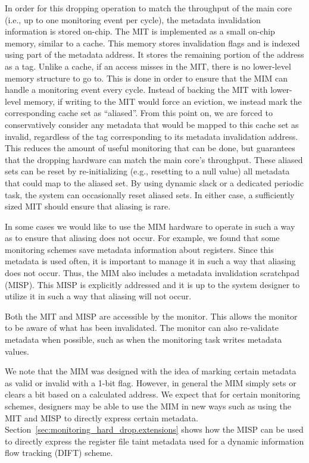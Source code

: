 In order for this dropping operation to match the throughput of the main core
(i.e., up to one monitoring event per cycle), the metadata invalidation
information is stored on-chip. The MIT is implemented as a small on-chip
memory, similar to a cache. This memory stores invalidation flags and is
indexed using part of the metadata address. It stores the remaining portion of
the address as a tag. Unlike a cache, if an access misses in the MIT, there is
no lower-level memory structure to go to. This is done in order to ensure that
the MIM can handle a monitoring event every cycle. Instead of backing the MIT
with lower-level memory, if writing to the MIT would force an eviction, we
instead mark the corresponding cache set as ``aliased''. From this point on, we
are forced to conservatively consider any metadata that would be mapped to this
cache set as invalid, regardless of the tag corresponding to its metadata
invalidation address. This reduces the amount of useful monitoring that can be
done, but guarantees that the dropping hardware can match the main core's
throughput. These aliased sets can be reset by re-initializing (e.g., resetting
to a null value) all metadata that could map to the aliased set. By using
dynamic slack or a dedicated periodic task, the system can occasionally reset
aliased sets. In either case, a sufficiently sized MIT should ensure that
aliasing is rare.

In some cases we would like to use the MIM hardware to operate in such a way as
to ensure that aliasing does not occur. For example, we found that some
monitoring schemes save metadata information about registers. Since this
metadata is used often, it is important to manage it in such a way that
aliasing does not occur. Thus, the MIM also includes a metadata invalidation
scratchpad (MISP). This MISP is explicitly addressed and it is up to the system
designer to utilize it in such a way that aliasing will not occur.

Both the MIT and MISP are accessible by the monitor. This allows the monitor to
be aware of what has been invalidated. The monitor can also re-validate
metadata when possible, such as when the monitoring task writes metadata
values.

We note that the MIM was designed with the idea of marking certain metadata as
valid or invalid with a 1-bit flag. However, in general the MIM simply sets or
clears a bit based on a calculated address. We expect that for certain
monitoring schemes, designers may be able to use the MIM in new ways such as
using the MIT and MISP to directly express certain metadata.
Section~\ref{sec:monitoring_hard_drop.extensions} shows how the MISP can be
used to directly express the register file taint metadata used for a dynamic
information flow tracking (DIFT) scheme.

